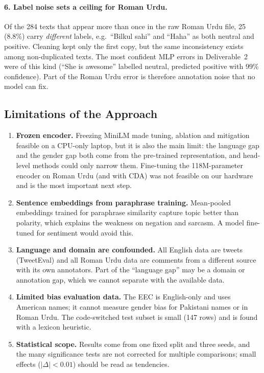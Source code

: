 \documentclass[11pt,a4paper]{article}
\begin{document}
\paragraph{6. Label noise sets a ceiling for Roman Urdu.} Of the 284 texts that appear more than
once in the raw Roman Urdu file, 25 (8.8\%) carry \emph{different} labels, e.g.\ ``Bilkul
sahi'' and ``Haha'' as both neutral and positive. Cleaning kept only the first copy, but the same
inconsistency exists among non-duplicated texts. The most confident MLP errors in Deliverable~2
were of this kind (``She is awesome'' labelled neutral, predicted positive with 99\%
confidence). Part of the Roman Urdu error is therefore annotation noise that no model can fix.

\subsection{Limitations of the Approach}
\label{sec:limits}
\begin{enumerate}
  \item \textbf{Frozen encoder.} Freezing MiniLM made tuning, ablation and mitigation feasible on
        a CPU-only laptop, but it is also the main limit: the language gap and the gender gap
        both come from the pre-trained representation, and head-level methods could only
        narrow them. Fine-tuning the 118M-parameter encoder on Roman Urdu (and with CDA) was
        not feasible on our hardware and is the most important next step.
  \item \textbf{Sentence embeddings from paraphrase training.} Mean-pooled embeddings trained
        for paraphrase similarity capture topic better than polarity, which explains the
        weakness on negation and sarcasm. A model fine-tuned for sentiment would avoid this.
  \item \textbf{Language and domain are confounded.} All English data are tweets (TweetEval) and
        all Roman Urdu data are comments from a different source with its own annotators. Part
        of the ``language gap'' may be a domain or annotation gap, which we cannot separate
        with the available data.
  \item \textbf{Limited bias evaluation data.} The EEC is English-only and uses American names;
        it cannot measure gender bias for Pakistani names or in Roman Urdu. The code-switched
        test subset is small (147 rows) and is found with a lexicon heuristic.
  \item \textbf{Statistical scope.} Results come from one fixed split and three seeds, and the
        many significance tests are not corrected for multiple comparisons; small effects
        ($|\Delta| < 0.01$) should be read as tendencies.
\end{enumerate}
\end{document}

